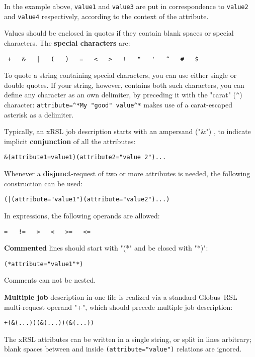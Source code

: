 \documentclass{book}
\newcommand{\globus}{Globus\textsuperscript{\textregistered}}
\begin{document}
  In the example above, \verb#value1# and \verb#value3# are put in correspondence to
  \verb#value2# and \verb#value4# respectively, according to the
  context of the attribute.

  Values should be enclosed in quotes if they contain blank
  spaces or special characters. The \textbf{special characters} are:
  \begin{shaded}    
    \verb. +   &   |   (   )   =   <   >   !   "   '   ^   #   $.%
  \end{shaded}

  To quote a string containing special characters, you can use 
  either single or double quotes. If your string, however, contains
  both such characters, you can define any character as an own
  delimiter, by preceding it with the "carat" (\verb#^#) character:
  \verb#attribute=^*My "good" value^*# makes use of a carat-escaped
  asterisk as a delimiter.

  Typically, an xRSL job description starts with an ampersand
  ("\&") , to indicate implicit \textbf{conjunction} of all the
  attributes:
  \begin{shaded}
    \verb#&(attribute1=value1)(attribute2="value 2")...#
  \end{shaded}

  Whenever a \textbf{disjunct}-request of two or more attributes is
  needed, the following construction can be used:
  \begin{shaded}
    \verb#(|(attribute="value1")(attribute="value2")...)#
  \end{shaded}

  In expressions, the following operands are allowed:
  \begin{shaded}
    \verb#=   !=   >   <   >=   <=#
  \end{shaded}

  \textbf{Commented} lines should start with "(*" and be
  closed with "*)":
  \begin{shaded}
    \verb#(*attribute="value1"*)#
  \end{shaded}
  Comments can not be nested.

  \textbf{Multiple job} description in one file is realized via a standard
  \globus\  RSL multi-request operand "+", which should precede
  multiple job description: 
  \begin{shaded}
    \verb#+(&(...))(&(...))(&(...))#
  \end{shaded}

  The xRSL attributes can be written in a single string, or split in
  lines arbitrary; blank spaces between and inside
  \verb#(attribute="value")# relations are ignored.
\end{document}
